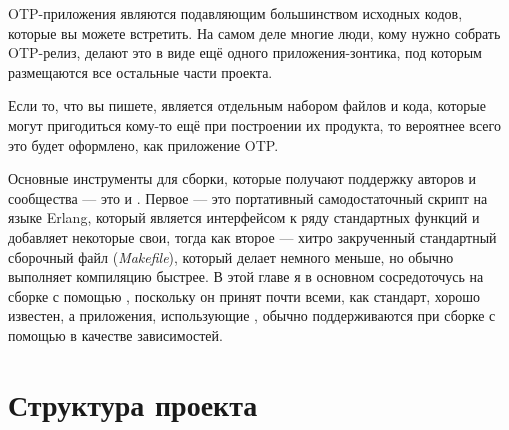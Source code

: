 \documentclass[11pt, oneside]{book}   	%
\begin{document}
OTP-приложения являются подавляющим большинством исходных кодов, которые вы можете встретить. На самом деле многие люди, кому нужно собрать OTP-релиз, делают это в виде ещё одного приложения-зонтика, под которым размещаются все остальные части проекта.

Если то, что вы пишете, является отдельным набором файлов и кода, которые могут пригодиться кому-то ещё при построении их продукта, то вероятнее всего это будет оформлено, как приложение OTP.

Основные инструменты для сборки, которые получают поддержку авторов и сообщества --- это  и . Первое --- это портативный самодостаточный скрипт на языке Erlang, который является интерфейсом к ряду стандартных функций и добавляет некоторые свои, тогда как второе --- хитро закрученный стандартный сборочный файл (\emph{Makefile}), который делает немного меньше, но обычно выполняет компиляцию быстрее. В этой главе я в основном сосредоточусь на сборке с помощью , поскольку он принят почти всеми, как стандарт, хорошо известен, а приложения, использующие , обычно поддерживаются при сборке с помощью  в качестве зависимостей.


\section{Структура проекта}
\label{sec:project-structure}
\end{document}
